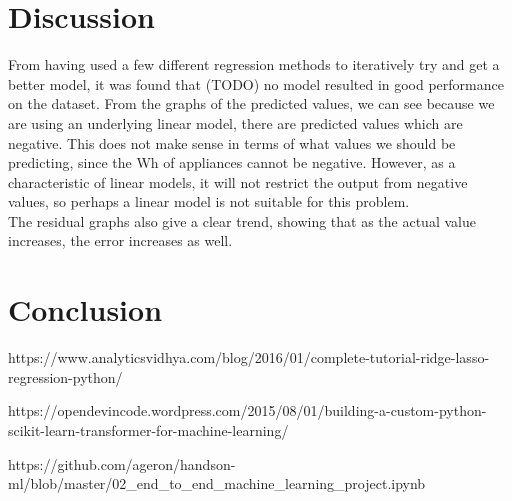 \documentclass{article}
\newcommand{\n}[0]{\\[\baselineskip]}
\begin{document}
\section{Discussion}
From having used a few different regression methods to iteratively try and get a better model, it was found that (TODO) no model resulted in good performance on the dataset. From the graphs of the predicted values, we can see because we are using an underlying linear model, there are predicted values which are negative. This does not make sense in terms of what values we should be predicting, since the Wh of appliances cannot be negative. However, as a characteristic of linear models, it will not restrict the output from negative values, so perhaps a linear model is not suitable for this problem. 
\n
The residual graphs also give a clear trend, showing that as the actual value increases, the error increases as well.


\section{Conclusion}

https://www.analyticsvidhya.com/blog/2016/01/complete-tutorial-ridge-lasso-regression-python/

https://opendevincode.wordpress.com/2015/08/01/building-a-custom-python-scikit-learn-transformer-for-machine-learning/

https://github.com/ageron/handson-ml/blob/master/02_end_to_end_machine_learning_project.ipynb

\printbibliography
\end{document}
